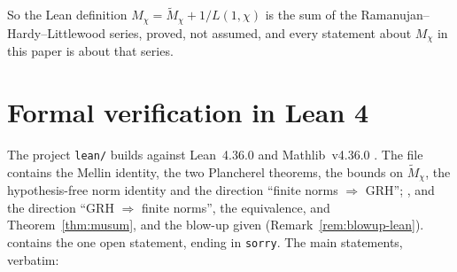 \documentclass[11pt]{amsart}
\newcommand{\lean}{\path}
\theoremstyle{definition}
\theoremstyle{remark}
\newcommand{\Mt}{\widetilde{M}_\chi}
\begin{document}
So the Lean definition $M_\chi=\Mt+1/L(1,\chi)$ is the sum of the Ramanujan--Hardy--Littlewood series, proved, not
assumed, and every statement about $M_\chi$ in this paper is about that series.

\section{Formal verification in Lean 4}\label{sec:lean}

The project \texttt{lean/} builds against Lean~4.36.0 and Mathlib~v4.36.0 \cite{Mathlib}. The file
 contains the Mellin identity,  the two
Plancherel theorems,  the bounds on $\Mt$,
 the hypothesis-free norm identity and
 the direction ``finite norms $\Rightarrow$ GRH'';
,  and  the
direction ``GRH $\Rightarrow$ finite norms'',  the equivalence, and
 Theorem~\ref{thm:musum}, and  the blow-up given
\lean{ZeroExpansion} (Remark~\ref{rem:blowup-lean}).
 contains the one open statement, ending in \texttt{sorry}.
The main statements, verbatim:
\end{document}
